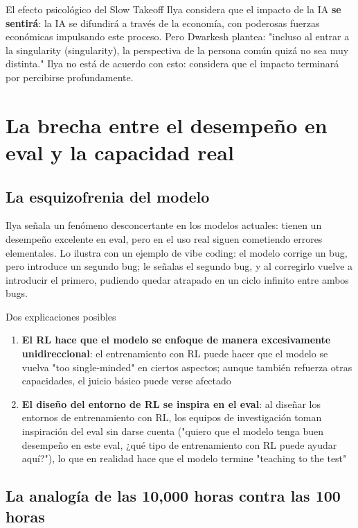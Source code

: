 \documentclass[a4paper]{article}
\begin{document}
\begin{knowledgebox}{El efecto psicológico del Slow Takeoff}
Ilya considera que el impacto de la IA \textbf{se sentirá}: la IA se difundirá a través de la economía, con poderosas fuerzas económicas impulsando este proceso. Pero Dwarkesh plantea: "incluso al entrar a la singularity (singularity), la perspectiva de la persona común quizá no sea muy distinta." Ilya no está de acuerdo con esto: considera que el impacto terminará por percibirse profundamente.
\end{knowledgebox}

\section{La brecha entre el desempeño en eval y la capacidad real}

\subsection{La esquizofrenia del modelo}

Ilya señala un fenómeno desconcertante en los modelos actuales: tienen un desempeño excelente en eval, pero en el uso real siguen cometiendo errores elementales. Lo ilustra con un ejemplo de vibe coding: el modelo corrige un bug, pero introduce un segundo bug; le señalas el segundo bug, y al corregirlo vuelve a introducir el primero, pudiendo quedar atrapado en un ciclo infinito entre ambos bugs.

\begin{importantbox}{Dos explicaciones posibles}
\begin{enumerate}
    \item \textbf{El RL hace que el modelo se enfoque de manera excesivamente unidireccional}: el entrenamiento con RL puede hacer que el modelo se vuelva "too single-minded" en ciertos aspectos; aunque también refuerza otras capacidades, el juicio básico puede verse afectado
    \item \textbf{El diseño del entorno de RL se inspira en el eval}: al diseñar los entornos de entrenamiento con RL, los equipos de investigación toman inspiración del eval sin darse cuenta ("quiero que el modelo tenga buen desempeño en este eval, ¿qué tipo de entrenamiento con RL puede ayudar aquí?"), lo que en realidad hace que el modelo termine "teaching to the test"
\end{enumerate}
\end{importantbox}

\subsection{La analogía de las 10,000 horas contra las 100 horas}
\end{document}
